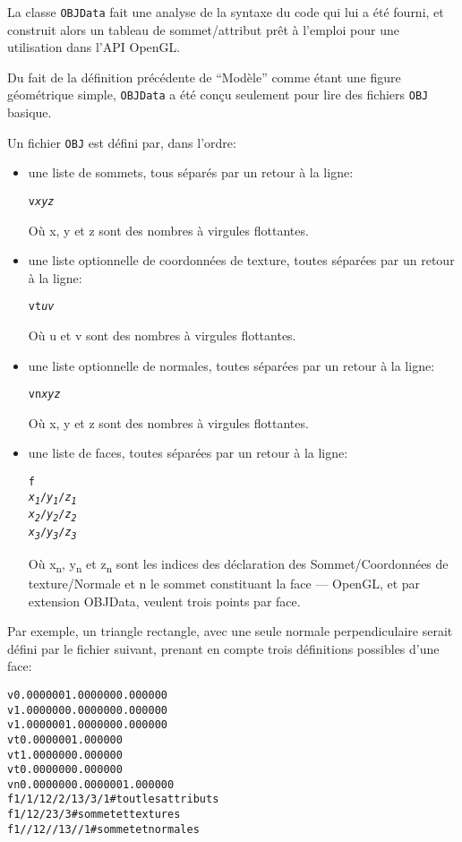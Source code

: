 \documentclass[pdftex, 11pt, a4paper, titlepage]{article}
\begin{document}
La classe \texttt{OBJData} fait une analyse de la syntaxe du code qui
lui a été fourni, et construit alors un tableau de sommet/attribut
prêt à l'emploi pour une utilisation dans l'API OpenGL.

Du fait de la définition précédente de ``Modèle'' comme étant une
figure géométrique simple, \texttt{OBJData} a été conçu seulement pour
lire des fichiers \texttt{OBJ} basique.

Un fichier \texttt{OBJ} est défini par, dans l'ordre:
\begin{itemize}

\item une liste de sommets, tous séparés par un retour à la ligne:
  \begin{alltt}
    v \emph{x} \emph{y} \emph{z}
  \end{alltt}
  Où x, y et z sont des nombres à virgules flottantes.

\item une liste optionnelle de coordonnées de texture, toutes séparées
  par un retour à la ligne:
  \begin{alltt}
    vt \emph{u} \emph{v}
  \end{alltt}
  Où u et v sont des nombres à virgules flottantes.

\item une liste optionnelle de normales, toutes séparées par un retour
  à la ligne:
  \begin{alltt}
    vn \emph{x} \emph{y} \emph{z}
  \end{alltt}
  Où x, y et z sont des nombres à virgules flottantes.

\item une liste de faces, toutes séparées par un retour à la ligne:
  \begin{alltt}
    f
    \emph{x\textsubscript{1}}/\emph{y\textsubscript{1}}/\emph{z\textsubscript{1}}
    \emph{x\textsubscript{2}}/\emph{y\textsubscript{2}}/\emph{z\textsubscript{2}}
    \emph{x\textsubscript{3}}/\emph{y\textsubscript{3}}/\emph{z\textsubscript{3}}
  \end{alltt}
  Où x\textsubscript{n}, y\textsubscript{n} et z\textsubscript{n} sont
  les indices des déclaration des Sommet/Coordonnées de
  texture/Normale et n
  le sommet constituant la face --- OpenGL, et par extension OBJData, veulent
trois points par face.
\end{itemize}

Par exemple, un triangle rectangle, avec une seule normale
perpendiculaire serait défini par le fichier suivant, prenant en
compte trois définitions possibles d'une face:
\begin{alltt}
v 0.000000 1.000000 0.000000 
v 1.000000 0.000000 0.000000
v 1.000000 1.000000 0.000000
vt 0.000000 1.000000
vt 1.000000 0.000000
vt 0.000000 0.000000 
vn 0.000000 0.000000 1.000000
f 1/1/1 2/2/1 3/3/1 # tout les attributs 
f 1/1 2/2 3/3       # sommet et textures
f 1//1 2//1 3//1    # sommet et normales
\end{alltt}
\end{document}
